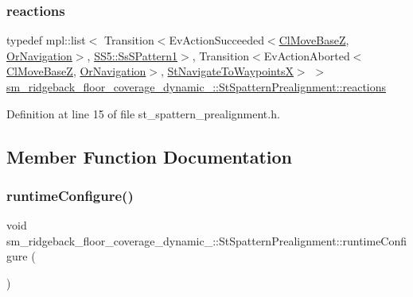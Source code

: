 \subsubsection{\texorpdfstring{reactions}{reactions}}
{\footnotesize\ttfamily typedef mpl\+::list$<$ Transition$<$Ev\+Action\+Succeeded$<$\hyperlink{classcl__move__base__z_1_1ClMoveBaseZ}{Cl\+Move\+BaseZ}, \hyperlink{classsm__ridgeback__floor__coverage__dynamic__1_1_1OrNavigation}{Or\+Navigation}$>$, \hyperlink{structsm__ridgeback__floor__coverage__dynamic__1_1_1SS5_1_1SsSPattern1}{S\+S5\+::\+Ss\+S\+Pattern1}$>$, Transition$<$Ev\+Action\+Aborted$<$\hyperlink{classcl__move__base__z_1_1ClMoveBaseZ}{Cl\+Move\+BaseZ}, \hyperlink{classsm__ridgeback__floor__coverage__dynamic__1_1_1OrNavigation}{Or\+Navigation}$>$, \hyperlink{structsm__ridgeback__floor__coverage__dynamic__1_1_1StNavigateToWaypointsX}{St\+Navigate\+To\+WaypointsX}$>$ $>$ \hyperlink{structsm__ridgeback__floor__coverage__dynamic__1_1_1StSpatternPrealignment_a4af4b4f5afa7590529a14f429fe7432a}{sm\+\_\+ridgeback\+\_\+floor\+\_\+coverage\+\_\+dynamic\+\_\+::\+St\+Spattern\+Prealignment\+::reactions}}



Definition at line 15 of file st\+\_\+spattern\+\_\+prealignment.\+h.



\subsection{Member Function Documentation}
\mbox{\label{structsm__ridgeback__floor__coverage__dynamic__1_1_1StSpatternPrealignment_a765af6fa395c6354bd29e27c8e102370}} 
\subsubsection{\texorpdfstring{runtime\+Configure()}{runtimeConfigure()}}
{\footnotesize\ttfamily void sm\+\_\+ridgeback\+\_\+floor\+\_\+coverage\+\_\+dynamic\+\_\+::\+St\+Spattern\+Prealignment\+::runtime\+Configure (\begin{DoxyParamCaption}{ }\end{DoxyParamCaption})\hspace{0.3cm}{\ttfamily [inline]}}



